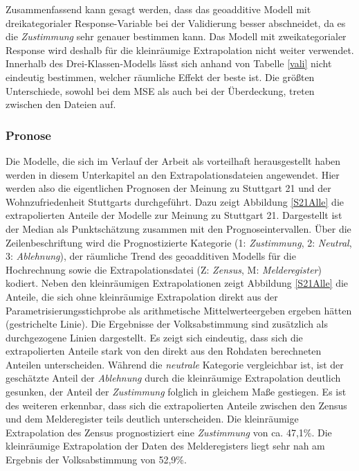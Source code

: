 \documentclass{Vorlage}
\begin{document}
Zusammenfassend kann gesagt werden, dass das geoadditive Modell mit dreikategorialer Response-Variable bei der Validierung besser abschneidet, da es die \textit{Zustimmung} sehr genauer bestimmen kann. Das Modell mit zweikategorialer Response wird deshalb für die kleinräumige Extrapolation nicht weiter verwendet. Innerhalb des Drei-Klassen-Modells lässt sich anhand von Tabelle \ref{vali} nicht eindeutig bestimmen, welcher räumliche Effekt der beste ist. Die größten Unterschiede, sowohl bei dem MSE als auch bei der Überdeckung, treten zwischen den Dateien auf.

\subsubsection{Pronose}
Die Modelle, die sich im Verlauf der Arbeit als vorteilhaft herausgestellt haben werden in diesem Unterkapitel an den Extrapolationsdateien angewendet. Hier werden also die eigentlichen Prognosen der Meinung zu Stuttgart 21 und der Wohnzufriedenheit Stuttgarts durchgeführt. Dazu zeigt Abbildung \ref{S21Alle} die extrapolierten Anteile der Modelle zur Meinung zu Stuttgart 21. Dargestellt ist der Median als Punktschätzung zusammen mit den Prognoseintervallen. Über die Zeilenbeschriftung wird die Prognostizierte Kategorie (1: \textit{Zustimmung}, 2: \textit{Neutral}, 3: \textit{Ablehnung}), der räumliche Trend des geoadditiven Modells für die Hochrechnung sowie die Extra\-polations\-datei (Z: \textit{Zensus}, M: \textit{Melderegister}) kodiert. Neben den kleinräumigen Extrapolationen zeigt Abbildung \ref{S21Alle} die Anteile, die sich ohne kleinräumige Extrapolation direkt aus der Parametrisierungsstichprobe als arithmetische Mittelwerteergeben ergeben hätten (gestrichelte Linie). Die Ergebnisse der Volksabstimmung sind zusätzlich als durchgezogene Linien dargestellt. Es zeigt sich eindeutig, dass sich die extrapolierten Anteile stark von den direkt aus den Rohdaten berechneten Anteilen unterscheiden. Während die \textit{neutrale} Kategorie vergleichbar ist, ist der geschätzte Anteil der \textit{Ablehnung} durch die kleinräumige Extrapolation deutlich gesunken, der Anteil der \textit{Zustimmung} folglich in gleichem Maße gestiegen. Es ist des weiteren erkennbar, dass sich die extrapolierten Anteile zwischen den Zensus und dem Melderegister teils deutlich unterscheiden. Die kleinräumige Extrapolation des Zensus prognostiziert eine \textit{Zustimmung} von ca. 47,1\%. Die kleinräumige Extrapolation der Daten des Melderegisters liegt sehr nah am Ergebnis der Volksabstimmung von 52,9\%. 
\end{document}
